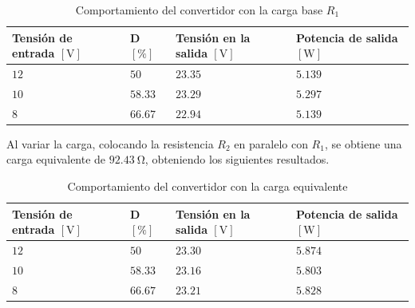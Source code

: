 \documentclass[conference]{IEEEtran}
\begin{document}
\begin{table}[H]
    \centering
    \renewcommand{\arraystretch}{1.5}
    \begin{tabularx}{\columnwidth}{
        >{\hsize=0.75\hsize}X 
        >{\hsize=0.75\hsize}X 
        >{\hsize=0.75\hsize}X 
        >{\hsize=0.75\hsize}X
    }
        \toprule
        Tensión de entrada $[\mathrm{V}]$& D $[\%]$ & Tensión en la salida $[\mathrm{V}]$ & Potencia de salida $[\mathrm{W}]$ \\
        \midrule
        $12$                             & $50$     & $23.35$                             & $5.139$                           \\
        $10$                             & $58.33$  & $23.29$                             & $5.297$                           \\
        $8$                              & $66.67$  & $22.94$                             & $5.139$                           \\
        \bottomrule
    \end{tabularx}
    \caption{Comportamiento del convertidor con la carga base $R_1$}
    \label{tab:comportamiento_carga_base}
\end{table}

Al variar la carga, colocando la resistencia $R_2$ en paralelo con $R_1$, se obtiene una carga equivalente de
$92.43~\mathrm{\Omega}$, obteniendo los siguientes resultados. 

\begin{table}[H]
    \centering
    \renewcommand{\arraystretch}{1.5}
    \begin{tabularx}{\columnwidth}{
        >{\hsize=0.75\hsize}X 
        >{\hsize=0.75\hsize}X 
        >{\hsize=0.75\hsize}X 
        >{\hsize=0.75\hsize}X
    }
        \toprule
        Tensión de entrada $[\mathrm{V}]$& D $[\%]$ & Tensión en la salida $[\mathrm{V}]$ & Potencia de salida $[\mathrm{W}]$ \\
        \midrule
        $12$                             & $50$     & $23.30$                             & $5.874$                           \\
        $10$                             & $58.33$  & $23.16$                             & $5.803$                           \\
        $8$                              & $66.67$  & $23.21$                             & $5.828$                           \\
        \bottomrule
    \end{tabularx}
    \caption{Comportamiento del convertidor con la carga equivalente}
    \label{tab:comportamiento_carga_equivalente}
\end{table}
\end{document}
